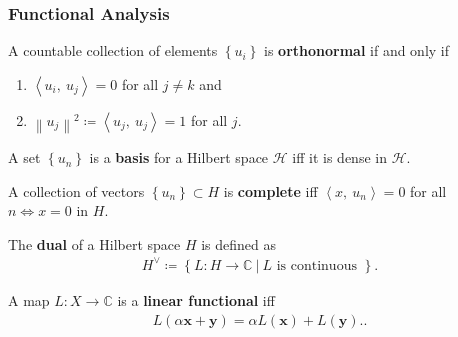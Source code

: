 \hypertarget{functional-analysis}{%
\subsubsection{Functional Analysis}\label{functional-analysis}}

\begin{definition}

A countable collection of elements \(\left\{{ u_i }\right\}\) is
\textbf{orthonormal} if and only if

\begin{enumerate}
\def\labelenumi{\arabic{enumi}.}
\tightlist
\item
  \({\left\langle {u_i},~{u_j} \right\rangle} = 0\) for all \(j \neq k\)
  and
\item
  \({\left\lVert {u_j} \right\rVert}^2 \coloneqq{\left\langle {u_j},~{u_j} \right\rangle} = 1\)
  for all \(j\).
\end{enumerate}

\end{definition}

\begin{definition}

A set \(\left\{{u_{n}}\right\}\) is a \textbf{basis} for a Hilbert space
\({\mathcal{H}}\) iff it is dense in \({\mathcal{H}}\).

\end{definition}

\begin{definition}

A collection of vectors \(\left\{{u_{n}}\right\}\subset H\) is
\textbf{complete} iff \({\left\langle {x},~{u_{n}} \right\rangle} = 0\)
for all \(n \iff x = 0\) in \(H\).

\end{definition}

\begin{definition}

The \textbf{dual} of a Hilbert space \(H\) is defined as
\begin{align*}
H^\vee\coloneqq\left\{{L: H\to {\mathbb{C}}{~\mathrel{\Big|}~}L \text{ is continuous }}\right\}
.\end{align*}

\end{definition}

\begin{definition}

A map \(L: X \to {\mathbb{C}}\) is a \textbf{linear functional} iff
\begin{align*}
L(\alpha\mathbf{x} + \mathbf{y}) = \alpha L(\mathbf{x}) + L(\mathbf{y}).
.\end{align*}

\end{definition}


